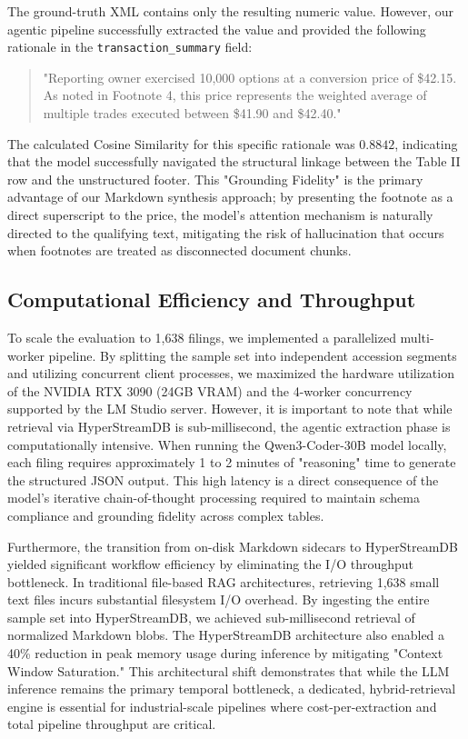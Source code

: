 \documentclass[journal, onecolumn]{IEEEtran}
\begin{document}
The ground-truth XML contains only the resulting numeric value. However, our agentic pipeline successfully extracted the value and provided the following rationale in the \texttt{transaction\_summary} field: 
\begin{quote}
    "Reporting owner exercised 10,000 options at a conversion price of \$42.15. As noted in Footnote 4, this price represents the weighted average of multiple trades executed between \$41.90 and \$42.40."
\end{quote}
The calculated Cosine Similarity for this specific rationale was $0.8842$, indicating that the model successfully navigated the structural linkage between the Table II row and the unstructured footer. This "Grounding Fidelity" is the primary advantage of our Markdown synthesis approach; by presenting the footnote as a direct superscript to the price, the model's attention mechanism is naturally directed to the qualifying text, mitigating the risk of hallucination that occurs when footnotes are treated as disconnected document chunks.

\subsection{Computational Efficiency and Throughput}
To scale the evaluation to 1,638 filings, we implemented a parallelized multi-worker pipeline. By splitting the sample set into independent accession segments and utilizing concurrent client processes, we maximized the hardware utilization of the NVIDIA RTX 3090 (24GB VRAM) and the 4-worker concurrency supported by the LM Studio server. However, it is important to note that while retrieval via HyperStreamDB is sub-millisecond, the agentic extraction phase is computationally intensive. When running the Qwen3-Coder-30B model locally, each filing requires approximately 1 to 2 minutes of "reasoning" time to generate the structured JSON output. This high latency is a direct consequence of the model's iterative chain-of-thought processing required to maintain schema compliance and grounding fidelity across complex tables.

Furthermore, the transition from on-disk Markdown sidecars to HyperStreamDB yielded significant workflow efficiency by eliminating the I/O throughput bottleneck. In traditional file-based RAG architectures, retrieving 1,638 small text files incurs substantial filesystem I/O overhead. By ingesting the entire sample set into HyperStreamDB, we achieved sub-millisecond retrieval of normalized Markdown blobs. The HyperStreamDB architecture also enabled a 40\% reduction in peak memory usage during inference by mitigating "Context Window Saturation." This architectural shift demonstrates that while the LLM inference remains the primary temporal bottleneck, a dedicated, hybrid-retrieval engine is essential for industrial-scale pipelines where cost-per-extraction and total pipeline throughput are critical.
\end{document}
